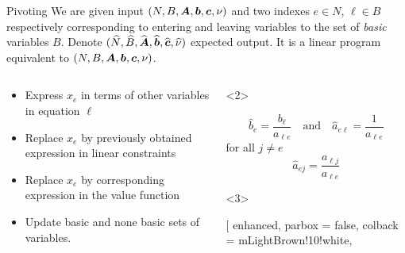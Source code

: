 \documentclass[32pt, aspectratio = 169]{beamer}
\begin{document}
\begin{frame}{Pivoting}
    We are given input $(N, B, \boldsymbol{A}, \boldsymbol{b}, \boldsymbol{c}, \nu)$ and two indexes $e \in N$, $\ell \in B$ respectively corresponding to entering and leaving variables to the set of \textit{basic} variables $B$. Denote $(\widehat{N}, \widehat{B}, \widehat{\boldsymbol{A}}, \widehat{\boldsymbol{b}}, \widehat{\boldsymbol{c}}, \widehat{\nu})$ expected output. It is a linear program equivalent to $(N, B, \boldsymbol{A}, \boldsymbol{b}, \boldsymbol{c}, \nu)$.
    \begin{columns}
        \begin{column}{.5\textwidth}
            \begin{itemize}
                \item[\textbullet]<2-> Express $x_e$ in terms of other variables in equation $\ell$
                \item[\textbullet]<3-> Replace $x_e$ by previously obtained expression in linear constraints
                \item[\textbullet]<4-> Replace $x_e$ by corresponding expression in the value function
                \item[\textbullet]<5-> Update basic and none basic sets of variables.
            \end{itemize}
        \end{column}
        \begin{column}{.5\textwidth}
            \begin{overlayarea}{.8\textwidth}{.5\textheight}
            \begin{onlyenv}<2>
                \begin{tcolorbox}[
                    enhanced,
                    parbox = false,
                    colback = mLightBrown!10!white,
                    colframe = mLightBrown,
                    arc = 0mm,
                    ]
                    \[
                    \widehat{b}_e = \frac{b_\ell}{a_{\ell e}} \quad
                    \text{and} \quad \widehat{a}_{e\ell} = \frac{1}{a_{\ell e}}
                    \]
                    for all $j \neq e$
                    \[
                    \widehat{a}_{ej} = \frac{a_{\ell j}}{a_{\ell e}}
                    \]
                    \end{tcolorbox}
            \end{onlyenv}
            \begin{onlyenv}<3>
                \begin{tcolorbox}[
                    enhanced,
                    parbox = false,
                    colback = mLightBrown!10!white,

\end{tcolorbox}
\end{onlyenv}
\end{overlayarea}
\end{column}
\end{columns}
\end{frame}
\end{document}
